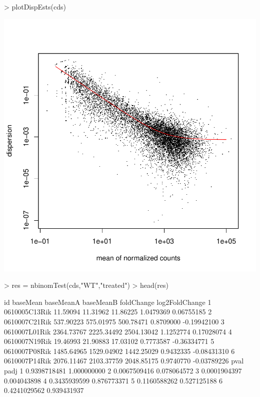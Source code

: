 \documentclass{article}
\begin{document}
\begin{Schunk}
\begin{Sinput}
> plotDispEsts(cds)
\end{Sinput}
\end{Schunk}
\includegraphics{JuanHenao_Taller3A-004}
\begin{Schunk}
\begin{Sinput}
> res = nbinomTest(cds,"WT","treated")
> head(res)
\end{Sinput}
\begin{Soutput}
             id   baseMean  baseMeanA  baseMeanB foldChange log2FoldChange
1 0610005C13Rik   11.59094   11.31962   11.86225  1.0479369     0.06755185
2 0610007C21Rik  537.90223  575.01975  500.78471  0.8709000    -0.19942100
3 0610007L01Rik 2364.73767 2225.34492 2504.13042  1.1252774     0.17028074
4 0610007N19Rik   19.46993   21.90883   17.03102  0.7773587    -0.36334771
5 0610007P08Rik 1485.64965 1529.04902 1442.25029  0.9432335    -0.08431310
6 0610007P14Rik 2076.11467 2103.37759 2048.85175  0.9740770    -0.03789226
          pval        padj
1 0.9398718481 1.000000000
2 0.0067509416 0.078064572
3 0.0001904397 0.004043898
4 0.3435939599 0.876773371
5 0.1160588262 0.527125188
6 0.4241029562 0.939431937
\end{Soutput}
\end{Schunk}
\begin{Schunk}
\end{Schunk}
\end{document}
